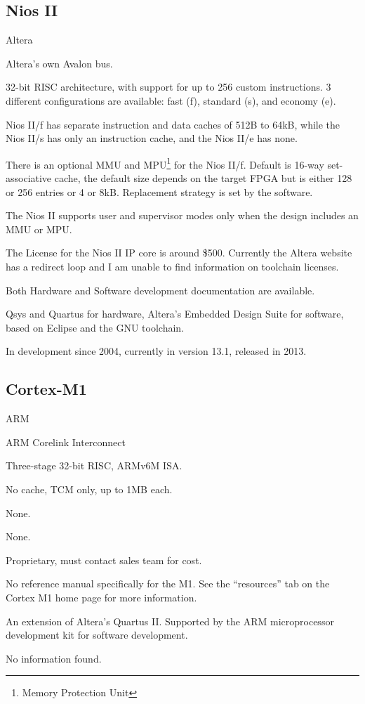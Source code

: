 \subsection{Nios II}
\begin{description}[style=nextline]
\item[Developer] Altera
\item[Bus Used] Altera's own Avalon bus.
\item[Architecture] 32-bit RISC architecture, with support for up to 256 custom instructions. 3 different configurations are available: fast (f), standard (s), and economy (e).
\item[Cache] Nios II/f has separate instruction and data caches of 512B to 64kB, while the Nios II/s has only an instruction cache, and the Nios II/e has none.
\item[MMU] There is an optional MMU and MPU\footnote{Memory Protection Unit} for the Nios II/f. Default is 16-way set-associative cache, the default size depends on the target FPGA but is either 128 or 256 entries or 4 or 8kB. Replacement strategy is set by the software.
\item[User Levels] The Nios II supports user and supervisor modes only when the design includes an MMU or MPU.
\item[License] The License for the Nios II IP core is around \$500. Currently the Altera website has a redirect loop and I am unable to find information on toolchain licenses.
\item[Documentation] Both Hardware and Software development documentation are available.\cite{nios-doc}
\item[Toolchain] Qsys and Quartus for hardware, Altera's Embedded Design Suite for software, based on Eclipse and the GNU toolchain.
\item[Maturity] In development since 2004, currently in version 13.1, released in 2013.
\end{description}

\subsection{Cortex-M1}
\begin{description}[style=nextline]
\item[Developer] ARM
\item[Bus Used] ARM Corelink Interconnect
\item[Architecture] Three-stage 32-bit RISC, ARMv6M ISA.
\item[Cache] No cache, TCM only, up to 1MB each.
\item[MMU] None.
\item[User Levels] None.
\item[License] Proprietary, must contact sales team for cost.
\item[Documentation] No reference manual specifically for the M1. See the ``resources'' tab on the Cortex M1 home page for more information.\cite{m1-home}
\item[Toolchain] An extension of Altera's Quartus II. Supported by the ARM microprocessor development kit for software development.
\item[Maturity] No information found.
\end{description}

